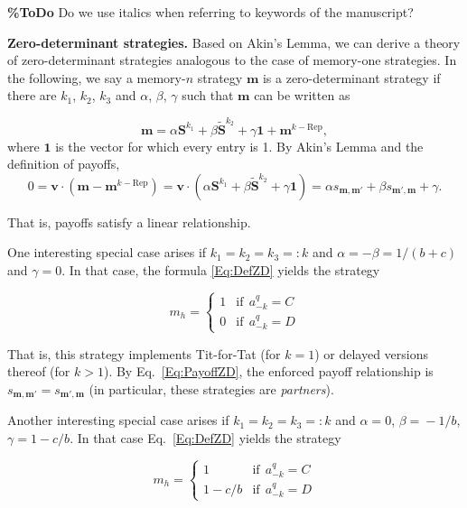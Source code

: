\documentclass{article}
\theoremstyle{definition}
\begin{document}
{\bf \%ToDo} Do we use italics when referring to keywords of the manuscript?

\noindent
{\bf Zero-determinant strategies.}
Based on Akin's Lemma, we can derive a theory of zero-determinant strategies
analogous to the case of memory-one strategies. In the following, we say a
memory-$n$ strategy $\mathbf{m}$ is a zero-determinant strategy if there are
$k_1$, $k_2$, $k_3$ and $\alpha$, $\beta$, $\gamma$ such that $\mathbf{m}$ can
be written as

\begin{equation} \label{Eq:DefZD}
\mathbf{m} = \alpha \mathbf{S}^{k_1} + \beta \mathbf{\tilde{S}}^{k_2} + \gamma \mathbf{1} + \mathbf{m}^{k-\text{Rep}},  
\end{equation} 
where $\mathbf{1}$ is the vector for which every entry is 1. By Akin's Lemma and the definition of payoffs,
\begin{equation} \label{Eq:PayoffZD}
0 = \mathbf{v} \cdot  (\mathbf{m} - \mathbf{m}^{k-\text{Rep}}) = \mathbf{v} \cdot (\alpha \mathbf{S}^{k_1} + \beta \mathbf{\tilde{S}}^{k_2} + \gamma \mathbf{1} ) = \alpha s_{\mathbf{m}, \mathbf{m'}} + \beta s_{\mathbf{m'}, \mathbf{m}} + \gamma. 
\end{equation}

That is, payoffs satisfy a linear relationship. 

One interesting special case arises if $k_1\!=\!k_2\!=\!k_3\!=:\!k$ and $\alpha
= -\beta =1/(b\!+\!c)$ and $\gamma=0$. In that case, the formula
\eqref{Eq:DefZD} yields the strategy

\begin{equation}
m_h = \left\{
\begin{array}{ll}
1	&\text{if}~~a^q_{-k}=C\\
0	&\text{if}~~a^q_{-k}=D
\end{array}
\right.
\end{equation}

That is, this strategy implements Tit-for-Tat (for $k\!=\!1$) or delayed
versions thereof (for $k\!>\!1$). By Eq.~\eqref{Eq:PayoffZD}, the enforced
payoff relationship is $s_{\mathbf{m}, \mathbf{m'}}\!=\! s_{\mathbf{m'}, \mathbf{m}}$ (in particular, these
strategies are {\it partners}).

Another interesting special case arises if  $k_1\!=\!k_2\!=\!k_3\!=:\!k$ and
$\alpha\!=\!0$, $\beta\!=\!-1/b$, $\gamma\!=\!1\!-\!c/b$. In that case
Eq.~\eqref{Eq:DefZD} yields the strategy

\begin{equation}
m_h = \left\{
\begin{array}{ll}
1	&\text{if}~~a^q_{-k}=C\\
1-c/b	&\text{if}~~a^q_{-k}=D
\end{array}
\right.
\end{equation}
\end{document}

